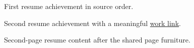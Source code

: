 \documentclass[medium=print]{careerdossier-resume}
\begin{document}
\MakeCDossierHeader
{}
\begin{CDossierEntry}[
  title={Engineer},
  organization={Example Labs},
  location={Toronto},
  dates={2024--2026}
]
\begin{CDossierItemize}
  \item First resume achievement in source order.
  \item Second resume achievement with a meaningful
        \href{https://example.test/work}{work link}.
\end{CDossierItemize}
\end{CDossierEntry}
\newpage
{}
\begin{CDossierEntry}[
  title={Senior Engineer},
  organization={Example Services},
  location={Ottawa},
  dates={2022--2024}
]
\begin{CDossierItemize}
  \item Second-page resume content after the shared page furniture.
\end{CDossierItemize}
\end{CDossierEntry}
\end{document}
